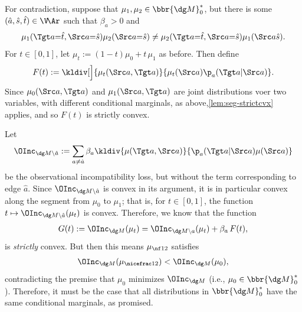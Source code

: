 \begin{lproof}\label{proof:marginonly}
    For contradiction, suppose that $\mu_1, \mu_2 \in \bbr{\dg M}_0^*$, but 
    there is some $(\hat a, \hat s, \hat t) \in \V\!\Ar$ such that $\beta_a > 0$ and
    \[
        \mu_1(\Tgt a{=}\hat t, \Src a{=}\hat s)\mu_2(\Src a{=}\hat s) \ne \mu_2(\Tgt a{=}\hat t, \Src a{=}\hat s) \mu_1(\Src a\hat s).
    \]
    For $t \in [0,1]$,
    let $\mu_t := (1-t) \mu_0 + t \, \mu_1$ as before.
    Then define
    \begin{align*}
        F(t) := \kldiv[\Big]{ \mu_t(\Src a, \Tgt a) }{  \mu_t(\Src a) \p_a(\Tgt a|\Src a) }.
    \end{align*}
    Since $\mu_0(\Src a, \Tgt a)$ and  $\mu_1(\Src a, \Tgt a)$ are joint distributions voer two variables, with different conditional marginals, as above,\cref{lem:seg-strictcvx} applies, and so $F(t)$ is strictly convex. 
    
    Let
    \[ \OInc_{\dg M \setminus \hat a}
        := \sum_{a \ne \hat a} \beta_a \kldiv{\mu(\Tgt a, \Src a)}{\p_a(\Tgt a|\Src a) \mu(\Src a)}
    \]
    be the observational incompatibility loss, but without the term corresponding to edge $\hat a$. 
    Since $\OInc_{\dg M \setminus \hat a}$ is convex in its argument, it is in particular convex along the segment from $\mu_0$ to $\mu_1$; that is, for $t \in [0,1]$, the function $t \mapsto \OInc_{\dg M \setminus \hat a}(\mu_t)$ is convex.
    Therefore, we know that the function
    \begin{align*}
        G(t) := 
        \OInc_{\dg M}(\mu_t) 
        =
        \OInc_{\dg M \setminus a}( \mu_t ) + \beta_a\, F(t),
    \end{align*}
    is \emph{strictly} convex. 
    But then this means $\mu_{\nf12}$ satisfies
    \[
        \OInc_{\dg M}( \mu_{\nicefrac12} ) < \OInc_{\dg M}( \mu_0 ),
    \]
    contradicting the premise that $\mu_0$ minimizes $\OInc_{\dg M}$ (i.e., $\mu_0 \in \bbr{\dg M}^*_0$). 
    Therefore, it must be the case that all distributions in $\bbr{\dg M}_0^*$ have the same conditional marginals, as promised.
\end{lproof}


